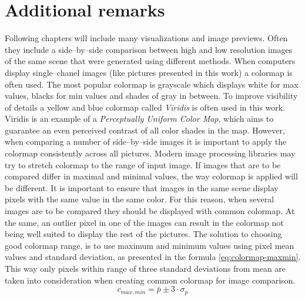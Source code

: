 \section{Additional remarks}
Following chapters will include many visualizations and image previews.
Often they include a side--by--side comparison between high and low resolution images of the same scene that were generated using different methods.
When computers display single--chanel images (like pictures presented in this work) a colormap is often used.
The most popular colormap is grayscale which displays white for max values, blacks for min values and shades of gray in between.
To improve visibility of details a yellow and blue colormap called \textit{Viridis} is often used in this work.
Viridis is an example of a \textit{Perceptually Uniform Color Map}, which aims to guarantee an even perceived contrast of all color shades in the map.
However, when comparing a number of side--by--side images it is important to apply the colormap consistently across all pictures.
Modern image processing libraries may try to stretch colormap to the range of input image.
If images that are to be compared differ in maximal and minimal values, the way colormap is applied will be different.
It is important to ensure that images in the same scene display pixels with the same value in the same color.
For this reason, when several images are to be compared they should be displayed with common colormap.
At the same, an outlier pixel in one of the images can result in the colormap not being well suited to display the rest of the pictures.
The solution to choosing good colormap range, is to use maximum and minimum values using pixel mean values and standard deviation, as presented in the formula \ref{eq:colormap-maxmin}.
This way only pixels within range of three standard deviations from mean are taken into consideration when creating common colormap for image comparison.
\begin{equation}
	c_{max,min} = \bar{p} \pm 3 \cdot \sigma_p
\label{eq:colormap-maxmin}
\end{equation}
  